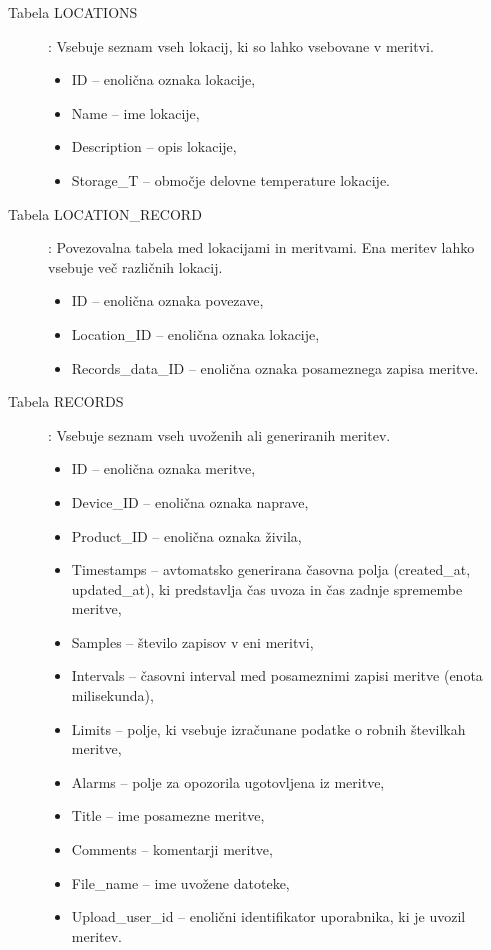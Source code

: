 \documentclass[a4paper, 12pt]{book}
\begin{document}
\begin{description}
\item[Tabela LOCATIONS] : Vsebuje seznam vseh lokacij, ki so lahko vsebovane v meritvi.
	\begin{itemize}
		\item ID – enolična oznaka lokacije,
		\item Name – ime lokacije,
		\item Description – opis lokacije,
		\item Storage\_T – območje delovne temperature lokacije.
	\end{itemize}
	
\item[Tabela LOCATION\_RECORD] : Povezovalna tabela med lokacijami in meritvami. Ena meritev lahko vsebuje več različnih lokacij.
	\begin{itemize}
		\item ID – enolična oznaka povezave,
		\item Location\_ID – enolična oznaka lokacije,
		\item Records\_data\_ID – enolična oznaka posameznega zapisa meritve.
	\end{itemize}
	
\item[Tabela RECORDS] : Vsebuje seznam vseh uvoženih ali generiranih meritev.
	\begin{itemize}
		\item ID – enolična oznaka meritve,
		\item Device\_ID – enolična oznaka naprave,
		\item Product\_ID – enolična oznaka živila,
		\item Timestamps – avtomatsko generirana časovna polja (created\_at, updated\_at), ki predstavlja čas uvoza in čas zadnje spremembe meritve,
		\item Samples – število zapisov v eni meritvi,
		\item Intervals – časovni interval med posameznimi zapisi meritve (enota milisekunda),
		\item Limits – polje, ki vsebuje izračunane podatke o robnih številkah meritve,
		\item Alarms – polje za opozorila ugotovljena iz meritve,
		\item Title – ime posamezne meritve,
		\item Comments – komentarji meritve,
		\item File\_name – ime uvožene datoteke,
		\item Upload\_user\_id – enolični identifikator uporabnika, ki je uvozil meritev.
	\end{itemize}
	

\end{description}
\end{document}
